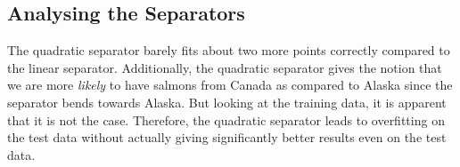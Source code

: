 \documentclass[11pt]{article}
\begin{document}
\subsection{Analysing the Separators}
The quadratic separator barely fits about two more points correctly compared to the linear separator. Additionally, the quadratic separator gives the notion that we are more \textit{likely} to have salmons from Canada as compared to Alaska since the separator bends towards Alaska. But looking at the training data, it is apparent that it is not the case. Therefore, the quadratic separator leads to overfitting on the test data without actually giving significantly better results even on
the test data.
\end{document}
